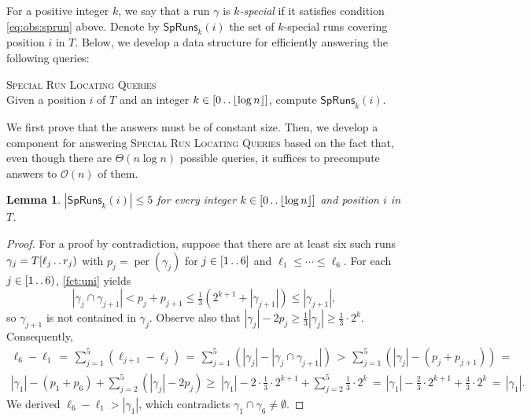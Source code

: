 \documentclass[a4paper]{article}
\newtheorem{lemma}[theorem]{Lemma}
\theoremstyle{definition}
\theoremstyle{remark}
\newcommand{\SPEC}{\mathsf{SpRuns}}
\newcommand{\floor}[1]{\left\lfloor #1 \right\rfloor}
\newcommand{\dd}{\mathinner{\ldotp\ldotp}}
\DeclareMathOperator{\per}{per}
\newcommand{\Oh}{\mathcal{O}}
\newenvironment{dsproblem}[1]
{\begin{center}\begin{lrbox}{\mybox}\begin{minipage}{0.96\columnwidth}{\textsc{#1}}\\}
{\end{minipage}\end{lrbox}\fbox{\usebox{\mybox}}\end{center}}
\newcommand{\defdsproblem}[2]{
  \begin{dsproblem}{#1}
#2
  \end{dsproblem}
  }
\begin{document}
For a positive integer $k$, we say that a run $\gamma$ is \emph{$k$-special} if 
it satisfies condition \eqref{eq:obs:sprun} above.
Denote by $\SPEC_k(i)$ the set of $k$-special runs covering position $i$ in $T$.
Below, we develop a data structure for efficiently answering the following queries:

\defdsproblem{\textsc{Special Run Locating Queries}}{
Given a position $i$ of $T$ and an integer $k\in [0\dd \floor{\log n}]$, 
compute $\SPEC_k(i)$.
}

We first prove that the answers must be of constant size. Then, we develop a component for answering \textsc{Special Run Locating Queries} based on the fact that, even though there are $\Theta(n\log n)$ possible queries, it suffices to precompute answers to $\Oh(n)$ of them.
\begin{lemma}\label{lem:atmost5}
$|\SPEC_k(i)|\le 5$ 
for every integer $k\in [0\dd \floor{\log n}]$ and position $i$ in $T$.
\end{lemma}
\begin{proof}
For a proof by contradiction, suppose that there are at least six such runs $\gamma_j = T[\ell_j\dd r_j)$
with $p_j = \per(\gamma_j)$ for $j\in [1\dd 6]$ and $\ell_1\le \cdots \le \ell_6$.
For each $j\in [1\dd 6)$, \cref{fct:uni} yields 
\[|\gamma_j\cap \gamma_{j+1}|< p_j + p_{j+1} \le \tfrac13(2^{k+1}+|\gamma_{j+1}|)\le |\gamma_{j+1}|,\]
 so $\gamma_{j+1}$ is not contained in $\gamma_j$.
Observe also that $|\gamma_j|-2p_j\ge \tfrac13 |\gamma_j|\ge \tfrac13\cdot 2^k$.
Consequently, 
\begin{multline*}
\ell_{6}-\ell_1 \,=\, \sum_{j=1}^{5}(\ell_{j+1}-\ell_j) \,=\, \sum_{j=1}^5 (|\gamma_j| - |\gamma_j\cap \gamma_{j+1}|)\,>\, 
\sum_{j=1}^5 (|\gamma_j| - (p_j+p_{j+1}))\,=\,\\
 |\gamma_1|-(p_1+p_6) + \sum_{j=2}^5 (|\gamma_j| -2 p_j) \ge\; |\gamma_1| - 2\cdot \tfrac13 \cdot 2^{k+1} + \sum_{j=2}^5 \tfrac13\cdot 2^k
\,=\, |\gamma_1| - \tfrac23\cdot 2^{k+1} + \tfrac43\cdot 2^k \,=\, |\gamma_1|.
\end{multline*}
We derived $\ell_{6}-\ell_1   > |\gamma_1|$, which contradicts $\gamma_1\cap \gamma_6 \ne \emptyset$.
\end{proof}
\end{document}
